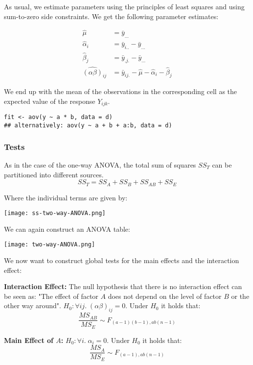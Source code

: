 As usual, we estimate parameters using the principles of least squares and using sum-to-zero side constraints. We get the following parameter estimates:

\begin{align*}
	\hat \mu &= \bar y_{...} \\
	\hat \alpha_i &= \bar y_{i..} - \bar y_{...} \\
	\hat \beta_j &= \bar y_{.j.} - \bar y_{...} \\
	\widehat {(\alpha \beta)}_{ij} &= \bar y_{ij.} - \hat \mu - \hat \alpha_i - \hat \beta_j
\end{align*}

We end up with the mean of the observations in the corresponding cell as the expected value of the response $Y_{ijk}$.

\begin{lstlisting}
fit <- aov(y ~ a * b, data = d) 
## alternatively: aov(y ~ a + b + a:b, data = d)
\end{lstlisting}

\subsubsection{Tests}

As in the case of the one-way ANOVA, the total sum of squares $SS_T$ can be partitioned into different sources.
$$SS_T = SS_A + SS_B + SS_{AB} + SS_E$$

Where the individual terms are given by:
\begin{center}
	\texttt{[image: ss-two-way-ANOVA.png]}
\end{center}

We can again construct an ANOVA table:

\begin{center}
	\texttt{[image: two-way-ANOVA.png]}
\end{center}

We now want to construct global tests for the main effects and the interaction effect: \medskip

\textbf{Interaction Effect:} The null hypothesis that there is no interaction effect can be seen as: "The effect of factor $A$ does not depend on the level of factor $B$ or the other way around". $H_0: \forall ij. \; (\alpha \beta)_{ij} = 0$. Under $H_0$ it holds that:
$$\frac{MS_{AB}}{MS_E} \sim F_{(a-1)(b-1),ab(n-1)}$$

\textbf{Main Effect of $A$:} $H_0: \forall i. \; \alpha_i = 0$. Under $H_0$ it holds that:
$$\frac{MS_{A}}{MS_E} \sim F_{(a-1), ab(n-1)}$$
 
